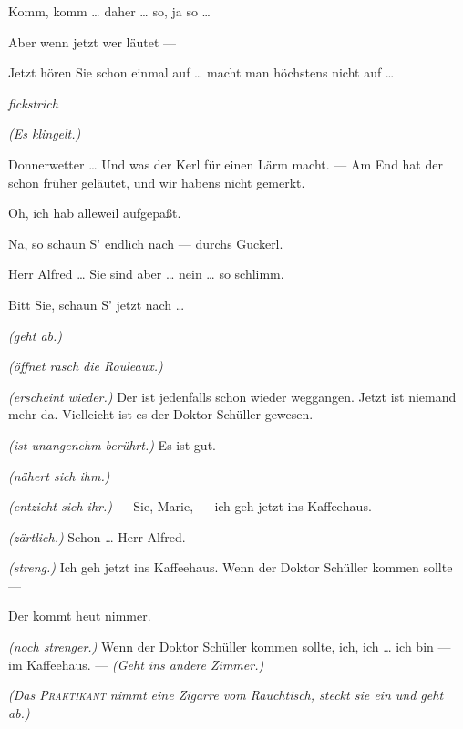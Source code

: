 \documentclass[
	final,
	a4paper,
	ngerman,
	mpinclude = true, %
	twoside = true,
	open = right,
	cleardoublepage = plain,
	DIV = 13,
	BCOR = 1cm,
	titlepage = firstiscover,
	]{scrbook}
\newcommand{\direction}[1]{\textit{(#1)}}
\newcommand{\hiat}{%
	\begin{center}
		\tiny
		\raisebox{0.5ex}{\rule{0.3\linewidth}{0.4pt}}
		\textit{fickstrich}
		\raisebox{0.5ex}{\rule{0.3\linewidth}{0.4pt}}
	\end{center}
}
\newcommand{\thecharacter}[1]{\textup{\textsc{#1}}\xspace}
\newcommand{\themaedchen}{\thecharacter{Praktikant}}
\newcommand{\theherr}{\thecharacter{Junger Herr}}
\newcommand{\character}[1]{\item[#1:]}
\newcommand{\maedchen}{\character{\themaedchen}}
\newcommand{\herr}{\character{\theherr}}
\begin{document}
\begin{play}
	\herr
	Komm, komm \ldots{} daher \ldots{} so, ja so \ldots{}

	\maedchen
	Aber wenn jetzt wer läutet ---

	\herr
	Jetzt hören Sie schon einmal auf \ldots{} macht man höchstens nicht auf \ldots{}

	\hiat

	\direction{Es klingelt.}

	\herr
	Donnerwetter \ldots{} Und was der Kerl für einen Lärm macht. --- Am End hat der schon früher geläutet, und wir habens nicht gemerkt.

	\maedchen
	Oh, ich hab alleweil aufgepaßt.

	\herr
	Na, so schaun S' endlich nach --- durchs Guckerl.

	\maedchen
	Herr Alfred \ldots{} Sie sind aber \ldots{} nein \ldots{} so schlimm.

	\herr
	Bitt Sie, schaun S' jetzt nach \ldots{}

	\maedchen
	\direction{geht ab.}

	\herr
	\direction{öffnet rasch die Rouleaux.}

	\maedchen
	\direction{erscheint wieder.} Der ist jedenfalls schon wieder weggangen. Jetzt ist niemand mehr da. Vielleicht ist es der Doktor Schüller gewesen.

	\herr
	\direction{ist unangenehm berührt.} Es ist gut.

	\maedchen
	\direction{nähert sich ihm.}

	\herr
	\direction{entzieht sich ihr.} --- Sie, Marie, --- ich geh jetzt ins Kaffeehaus.

	\maedchen
	\direction{zärtlich.} Schon \ldots{} Herr Alfred.

	\herr
	\direction{streng.} Ich geh jetzt ins Kaffeehaus. Wenn der Doktor Schüller kommen sollte ---

	\maedchen
	Der kommt heut nimmer.

	\herr
	\direction{noch strenger.} Wenn der Doktor Schüller kommen sollte, ich, ich \ldots{} ich bin --- im Kaffeehaus. --- \direction{Geht ins andere Zimmer.}

	\direction{Das \themaedchen{} nimmt eine Zigarre vom Rauchtisch, steckt sie ein und geht ab.}

\end{play}
\end{document}
